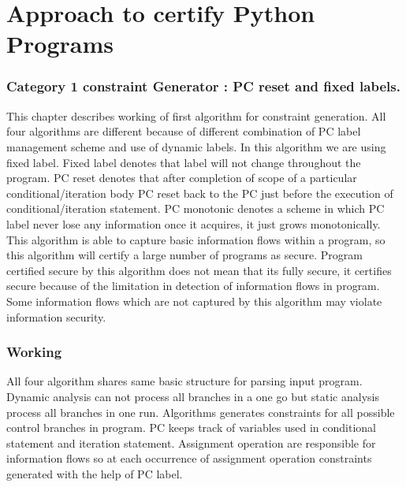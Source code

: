 \chapter{Approach to certify Python Programs}
\label{ch:certify}
\subsection{ Category 1 constraint Generator : PC reset and fixed labels.}
\label{ch:c1}
This chapter describes working of first algorithm for constraint generation. All four algorithms are different because of different combination of PC label management scheme and  use of dynamic labels. In this algorithm we are using fixed label. Fixed label denotes that label will not change throughout the program. PC reset denotes that after completion of scope of a particular conditional/iteration body PC reset back to the PC just before the execution of conditional/iteration statement. PC monotonic denotes a scheme in which PC label never lose any information once it acquires, it just grows monotonically. This algorithm is able to capture basic information flows within a program, so this algorithm will certify a large number of programs as secure. Program certified secure by this algorithm does not mean that its fully secure, it certifies secure because of the limitation in detection of information flows in program. Some information flows which are not captured by this algorithm may violate information security.\\
\subsection{Working}
All four algorithm shares same basic structure for parsing input program. Dynamic analysis can not process all branches in a one go but static analysis process all branches in one run. Algorithms generates constraints for all possible control branches in program.  PC keeps track of variables used in conditional statement and iteration statement. Assignment operation are responsible for information flows so at each occurrence of assignment operation constraints generated with the help of PC label.
